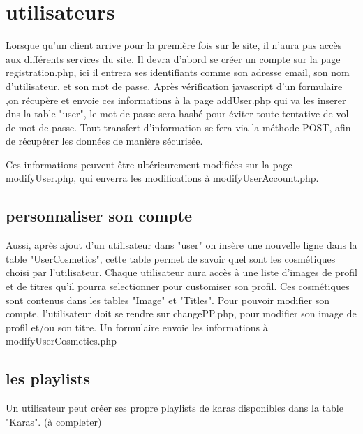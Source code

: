 \section{utilisateurs}

Lorsque qu'un client arrive pour la première fois sur le site, il n'aura pas accès aux différents services du site. Il devra d'abord se créer un compte sur la page registration.php, ici il entrera ses 
identifiants comme son adresse email, son nom d'utilisateur, et son mot de passe. Après vérification javascript d'un formulaire ,on récupère et envoie ces informations à la page addUser.php qui va les inserer dns la table "user", le mot de passe sera hashé pour éviter toute tentative de vol de mot de passe. Tout transfert d'information se fera via la méthode POST, afin de récupérer les données de manière sécurisée.
\newline

Ces informations peuvent être  ultérieurement modifiées sur la page modifyUser.php, qui enverra les modifications à modifyUserAccount.php.\newline

\subsection{personnaliser son compte}

Aussi, après ajout d'un utilisateur dans "user" on insère une nouvelle ligne dans la table "UserCosmetics", cette table permet de savoir quel sont les cosmétiques choisi par l'utilisateur.  
Chaque utilisateur aura accès à une liste d'images de profil et de titres qu'il pourra selectionner pour customiser son profil. Ces cosmétiques sont contenus dans les tables "Image" et "Titles". 
\newline
Pour pouvoir modifier son compte, l'utilisateur doit se rendre sur changePP.php, pour modifier son image de profil et/ou son titre. Un formulaire envoie les informations à modifyUserCosmetics.php\newline

\subsection{les playlists}

Un utilisateur peut créer ses propre playlists de karas disponibles dans la table "Karas".  (à completer)

